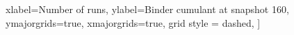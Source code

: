 		xlabel={Number of runs},
		ylabel={Binder cumulant at snapshot 160},
		ymajorgrids=true,
		xmajorgrids=true,
		grid style = dashed,
		]
